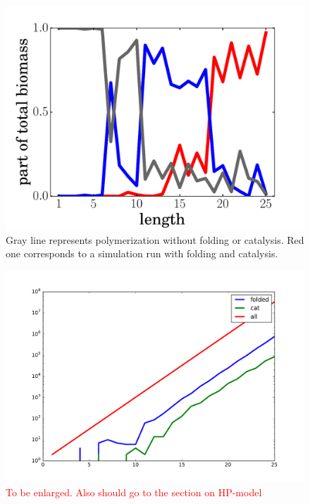 \documentclass[journal=jacsat,manuscript=article,layout=twocolumn]{achemso}
\newcommand*{\red}[1]{\textcolor{red}{#1}}
\begin{document}
\begin{figure}[h!]
  \centering
  \includegraphics[width=\columnwidth]{pictures/biomass.pdf} 
  \caption{\footnotesize{Gray line represents polymerization without folding or catalysis. Red one 
corresponds to a simulation run with folding and catalysis. }}
  \label{fig:biomass}
\end{figure}

\begin{figure}[h!]
  \centering
  \includegraphics[width=\columnwidth]{pictures/hp-statistics.pdf} 
  \caption{\red{To be enlarged. Also should go to the section on HP-model }}
  \label{fig:biomass}
\end{figure}
\end{document}
